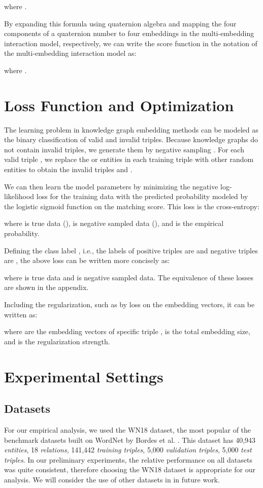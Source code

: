 \documentclass[sigconf,edbt]{acmart-edbt2019}
\begin{document}
where .

By expanding this formula using quaternion algebra \cite{kantor_hypercomplexnumberselementary_1989} and mapping the four components of a quaternion number to four embeddings in the multi-embedding interaction model, respectively, we can write the score function in the notation of the multi-embedding interaction model as:

where .


\section{Loss Function and Optimization}
The learning problem in knowledge graph embedding methods can be modeled as the binary classification of valid and invalid triples. Because knowledge graphs do not contain invalid triples, we generate them by negative sampling \cite{mikolov_efficientestimationword_2013}. For each valid triple , we replace the  or  entities in each training triple with other random entities to obtain the invalid triples  and  \cite{bordes_translatingembeddingsmodeling_2013}. 

We can then learn the model parameters by minimizing the negative log-likelihood loss for the training data with the predicted probability modeled by the logistic sigmoid function  on the matching score. This loss is the cross-entropy:

where  is true data (),  is negative sampled data (), and  is the empirical probability.

Defining the class label , i.e., the labels of positive triples are  and negative triples are , the above loss can be written more concisely as:

where  is true data and  is negative sampled data. The equivalence of these losses are shown in the appendix.

Including the regularization, such as by  loss on the embedding vectors, it can be written as:

where  are the embedding vectors of specific triple ,  is the total embedding size, and  is the regularization strength.

\section{Experimental Settings}
\subsection{Datasets}
For our empirical analysis, we used the WN18 dataset, the most popular of the benchmark datasets built on WordNet \cite{millergeorgea._wordnetlexicaldatabase_1995} by Bordes et al. \cite{bordes_translatingembeddingsmodeling_2013}. This dataset has 40,943 \textit{entities}, 18 \textit{relations}, 141,442 \textit{training triples}, 5,000 \textit{validation triples}, 5,000 \textit{test triples}. In our preliminary experiments, the relative performance on all datasets was quite consistent, therefore choosing the WN18 dataset is appropriate for our analysis. We will consider the use of other datasets in in future work.
\end{document}
